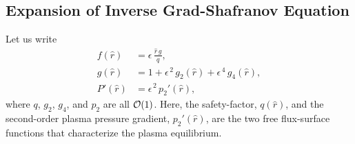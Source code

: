 \documentclass[12pt,prb,aps]{revtex4-1}
\begin{document}
\subsection{Expansion of Inverse Grad-Shafranov Equation}\label{exp}
Let us write\,\cite{tj,tj1}
\begin{align}\label{e26v}
f(\hat{r})&= \epsilon\,\frac{\hat{r}\,g}{q},\\[0.5ex]
g(\hat{r}) &= 1+ \epsilon^{\,2}\,g_2(\hat{r}) + \epsilon^{\,4}\,g_4(\hat{r}),\label{e27v}\\[0.5ex]
P'(\hat{r}) &= \epsilon^{\,2}\,p_2'(\hat{r}),\label{eq1}
\end{align}
where $q$,  $g_2$, $g_4$, and $p_2$ are all ${\cal O}(1)$. Here, the safety-factor, $q(\hat{r})$, and the second-order plasma
pressure gradient, $p_2'(\hat{r})$, are the two free flux-surface functions that characterize the plasma equilibrium.
\end{document}
